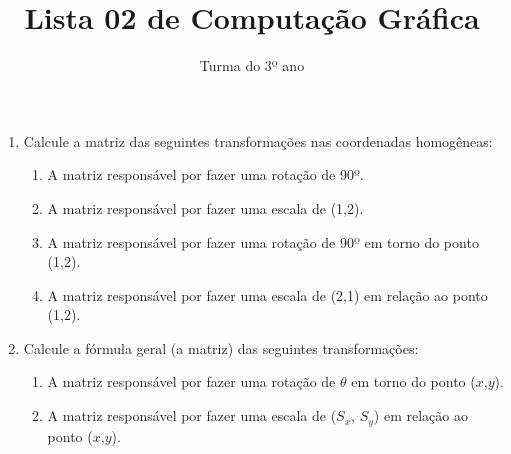 \documentclass[12pt]{article}
\title{Lista 02 de Computação Gráfica}
\date{}
\author{Turma do 3º ano}
\begin{document}
\maketitle

\begin{enumerate}


\item Calcule a matriz das seguintes transformações nas coordenadas homogêneas:

\begin{enumerate}

\item A matriz responsável por fazer uma rotação de 90º.

\item A matriz responsável por fazer uma escala de (1,2).

\item A matriz responsável por fazer uma rotação de 90º em torno do ponto (1,2).

\item A matriz responsável por fazer uma escala de (2,1) em relação ao ponto (1,2).

\end{enumerate}

\item Calcule a fórmula geral (a matriz) das seguintes transformações:

\begin{enumerate}

\item A matriz responsável por fazer uma rotação de $\theta$ em torno do ponto ($x$,$y$).

\item A matriz responsável por fazer uma escala de ($S_x$, $S_y$) em relação ao ponto ($x$,$y$).

\end{enumerate}


\end{enumerate}
\end{document}
